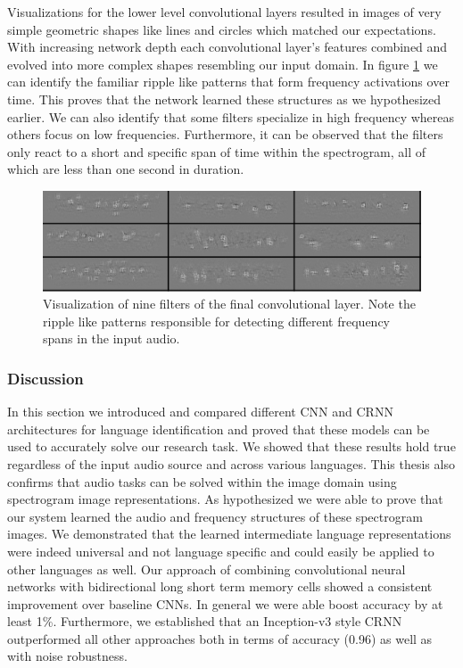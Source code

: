 Visualizations for the lower level convolutional layers resulted in images of very simple geometric shapes like lines and circles which matched our expectations. With increasing network depth each convolutional layer's features combined and evolved into more complex shapes resembling our input domain. In figure \ref{fig:conv_filter} we can identify the familiar ripple like patterns that form frequency activations over time. This proves that the network learned these structures as we hypothesized earlier. We can also identify that some filters specialize in high frequency whereas others focus on low frequencies. Furthermore, it can be observed that the filters only react to a short and specific span of time within the spectrogram, all of which are less than one second in duration.

	\begin{figure}[h]
  		\centering
    	\includegraphics[width=\textwidth, keepaspectratio]{img/conv_filter.png}
    	\caption{Visualization of nine filters of the final convolutional layer. Note the ripple like patterns responsible for detecting different frequency spans in the input audio.}
    	\label{fig:conv_filter}
	\end{figure}

\subsubsection{Discussion} 
\label{sec:comparison}
In this section we introduced and compared different CNN and CRNN architectures for language identification and proved that these models can be used to accurately solve our research task. We showed that these results hold true regardless of the input audio source and across various languages. This thesis also confirms that audio tasks can be solved within the image domain using spectrogram image representations. As hypothesized we were able to prove that our system learned the audio and frequency structures of these spectrogram images. We demonstrated that the learned intermediate language representations were indeed universal and not language specific and could easily be applied to other languages as well.
 Our approach of combining convolutional neural networks with bidirectional long short term memory cells showed a consistent improvement over baseline CNNs. In general we were able boost accuracy by at least 1\%. Furthermore, we established that an Inception-v3 style CRNN outperformed all other approaches both in terms of accuracy (0.96) as well as with noise robustness. 

